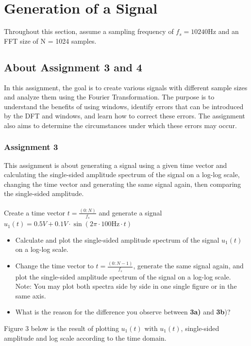 \documentclass[
	a4paper,
	11pt,
]{article}
\begin{document}
\section{Generation of a Signal}
Throughout this section, assume a sampling frequency of \(f_s = 10240\)Hz and an FFT size of N = 1024 samples.

\subsection{About Assignment 3 and 4}
In this assignment, the goal is to create various signals with different sample sizes and analyze them using the Fourier Transformation. The purpose is to understand the benefits of using windows, identify errors that can be introduced by the DFT and windows, and learn how to correct these errors. The assignment also aims to determine the circumstances under which these errors may occur.
\\

\subsubsection{Assignment 3}
This assignment is about generating a signal using a given time vector and calculating the single-sided amplitude spectrum of the signal on a log-log scale, changing the time vector and generating the same signal again, then comparing the single-sided amplitude.\\
\\
Create a time vector \(t=\frac{(0:N)}{f_s}\) and generate a signal \(u_1(t) = 0.5V + 0.1V\cdot\sin(2\pi\cdot100\text{Hz}\cdot t)\)\\

\begin{itemize}
\item Calculate and plot the single-sided amplitude spectrum of the signal \(u_1(t)\) on a log-log scale.
\item Change the time vector to \(t = \frac{(0:N-1)}{f_s}\), generate the same signal again, and plot the single-sided amplitude spectrum of the signal on a log-log scale. Note: You may plot both spectra side by side in one single figure or in the same axis.
\item What is the reason for the difference you observe between \textbf{3a)} and \textbf{3b})?
\end{itemize}

Figure 3 below is the result of plotting \(u_1(t)\) with \(u_1(t)\), single-sided amplitude and log scale according to the time domain.\\
\end{document}
